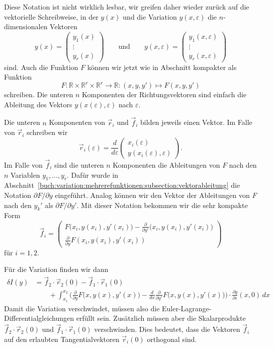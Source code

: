 Diese Notation ist nicht wirklich lesbar, wir greifen daher wieder
zurück auf die vektorielle Schreibweise, in der 
$y(x)$ und die Variation $y(x,\varepsilon)$ die $n$-dimensionalen
Vektoren
\[
y(x)
=
\begin{pmatrix}
y_1(x)\\
\vdots\\
y_r(x)
\end{pmatrix}
\qquad
\text{und}
\qquad
y(x,\varepsilon)
=
\begin{pmatrix}
y_1(x,\varepsilon)\\
\vdots\\
y_r(x,\varepsilon)
\end{pmatrix}
\]
sind.
Auch die Funktion $F$ können wir jetzt wie in Abschnitt
kompakter als
Funktion
\[
F\colon
\mathbb{R}\times \mathbb{R}^r\times\mathbb{R}^r
\to
\mathbb{R}
:
(x,y,y')
\mapsto
F(x,y,y')
\]
schreiben.
Die unteren $n$ Komponenten der Richtungsvektoren sind einfach
die Ableitung des Vektors
$y(x(\varepsilon),\varepsilon)$ nach $\varepsilon$.

Die unteren $n$ Komponenten von $\vec{r}_i$ und $\vec{f}_i$ bilden jeweils
einen Vektor.
Im Falle von $\vec{r}_i$ schreiben wir
\[
\vec{r}_i(\varepsilon)
=
\frac{d}{d\varepsilon}
\begin{pmatrix}
x_i(\varepsilon)\\
y(x_i(\varepsilon),\varepsilon)
\end{pmatrix}.
\]
Im Falle von $\vec{f}_i$ sind die unteren $n$ Komponenten
die Ableitungen von $F$ nach den $n$ Variablen $y_1,\dots,y_r$.
Dafür wurde in
Abschnitt~\ref{buch:variation:mehrerefunktionen:subsection:vektorableitung}
die Notation $\partial F/\partial y$ eingeführt.
Analog können wir den Vektor der Ableitungen von $F$ nach den
$y_k'$ als $\partial F/\partial y'$.
Mit dieser Notation bekommen wir die sehr kompakte Form
\[
\vec{f}_i
=
\begin{pmatrix}
\displaystyle
F\bigl(x_i,y(x_i),y'(x_i)\bigr)
-
\frac{\partial}{\partial y'}\bigl(x_i,y(x_i),y'(x_i)\bigr)
\\[5pt]
\displaystyle
\frac{\partial}{\partial y} F(x_i,y(x_i),y'(x_i))
\end{pmatrix}
\]
für $i=1,2$.

Für die Variation finden wir dann
\begin{align*}
\delta I(y)
&=
\vec{f}_2\cdot \vec{r}_2(0)
-
\vec{f}_1\cdot \vec{r}_1(0)
\\
&\qquad
+
\int_{x_1}^{x_2}
\biggl(
\frac{\partial}{\partial y}F\bigl(x,y(x),y'(x)\bigr)
-
\frac{d}{dx}
\frac{\partial}{\partial y'}F\bigl(x,y(x),y'(x)\bigr)
\biggr)
\cdot
\frac{\partial y}{\partial\varepsilon}(x,0)
\,dx
\end{align*}
Damit die Variation verschwindet, müssen also die
Euler-Lagrange-Differential\-glei\-chun\-gen erfüllt sein.
Zusätzlich müssen aber die Skalarprodukte
$\vec{f}_2\cdot \vec{r}_2(0)$
und
$\vec{f}_1\cdot \vec{r}_1(0)$
verschwinden.
Dies bedeutet, dass die Vektoren $\vec{f}_i$ auf den erlaubten
Tangentialvektoren $\vec{r}_i(0)$ orthogonal sind.






